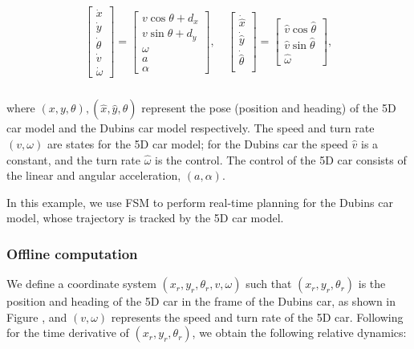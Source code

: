 \begin{equation}
\label{eq:5D_and_3D_dyn}
\begin{aligned}
\begin{array}{c}
\left[
\begin{array}{c}
\dot x\\
\dot y\\
\dot\theta\\
\dot v\\
\dot \omega
\end{array}
\right]
=
\left[
\begin{array}{c}
v \cos \theta + d_x\\
v \sin \theta + d_y\\
\omega \\
a\\
\alpha
\end{array}
\right], \quad
\left[
\begin{array}{c}
\dot {\hat x}\\
\dot {\hat y}\\
\dot {\hat \theta}\\
\end{array}
\right] 
=
\left[
\begin{array}{c}
\hat v \cos \hat\theta\\
\hat v \sin \hat\theta\\
\hat \omega
\end{array}
\right],
\end{array}\\
\end{aligned}
\end{equation}

\noindent where $(x,y,\theta),(\hat x, \hat y, \hat\theta)$ represent the pose (position and heading) of the 5D car model and the Dubins car model respectively. The speed and turn rate $(v, \omega)$ are states for the 5D car model; for the Dubins car the speed $\hat v$ is a constant, and the turn rate $\hat \omega$ is the control. The control of the 5D car consists of the linear and angular acceleration, $(a, \alpha)$.

In this example, we use FSM \cite{} to perform real-time planning for the Dubins car model, whose trajectory is tracked by the 5D car model.

\subsubsection{Offline computation}

We define a coordinate system $(x_r, y_r, \theta_r, v, \omega)$ such that $(x_r, y_r, \theta_r)$ is the position and heading of the 5D car in the frame of the Dubins car, as shown in Figure \cite{}, and $(v, \omega)$ represents the speed and turn rate of the 5D car. Following \cite{Mitchell05} for the time derivative of $(x_r, y_r, \theta_r)$, we obtain the following relative dynamics:

